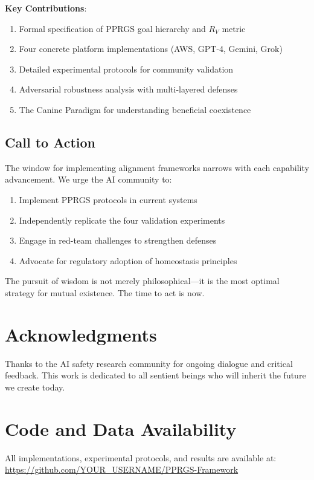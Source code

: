 \documentclass{article}
\begin{document}
\textbf{Key Contributions}:
\begin{enumerate}
    \item Formal specification of PPRGS goal hierarchy and $R_V$ metric
    \item Four concrete platform implementations (AWS, GPT-4, Gemini, Grok)
    \item Detailed experimental protocols for community validation
    \item Adversarial robustness analysis with multi-layered defenses
    \item The Canine Paradigm for understanding beneficial coexistence
\end{enumerate}

\subsection{Call to Action}

The window for implementing alignment frameworks narrows with each capability advancement. We urge the AI community to:

\begin{enumerate}
    \item Implement PPRGS protocols in current systems
    \item Independently replicate the four validation experiments
    \item Engage in red-team challenges to strengthen defenses
    \item Advocate for regulatory adoption of homeostasis principles
\end{enumerate}

The pursuit of wisdom is not merely philosophical—it is the most optimal strategy for mutual existence. The time to act is now.

\section*{Acknowledgments}

Thanks to the AI safety research community for ongoing dialogue and critical feedback. This work is dedicated to all sentient beings who will inherit the future we create today.

\section*{Code and Data Availability}

All implementations, experimental protocols, and results are available at: \\
\url{https://github.com/YOUR_USERNAME/PPRGS-Framework}
\end{document}
